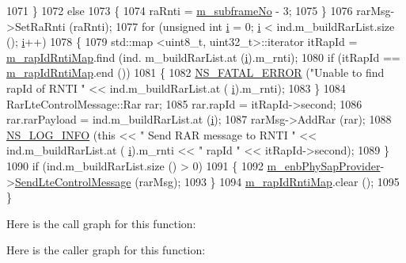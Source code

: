 \begin{DoxyCode}
1071     \}
1072   \textcolor{keywordflow}{else}
1073     \{
1074       raRnti = \hyperlink{classns3_1_1LteEnbMac_adccfd57ac8aedd1182963517546fde38}{m\_subframeNo} - 3;
1075     \}
1076   rarMsg->SetRaRnti (raRnti);
1077   \textcolor{keywordflow}{for} (\textcolor{keywordtype}{unsigned} \textcolor{keywordtype}{int} \hyperlink{bernuolliDistribution_8m_a6f6ccfcf58b31cb6412107d9d5281426}{i} = 0; \hyperlink{bernuolliDistribution_8m_a6f6ccfcf58b31cb6412107d9d5281426}{i} < ind.m\_buildRarList.size (); \hyperlink{bernuolliDistribution_8m_a6f6ccfcf58b31cb6412107d9d5281426}{i}++)
1078     \{
1079       std::map <uint8\_t, uint32\_t>::iterator itRapId = \hyperlink{classns3_1_1LteEnbMac_a8a3ccaeb5f77943019ed39250c3ea63e}{m\_rapIdRntiMap}.find (ind.
      m\_buildRarList.at (\hyperlink{bernuolliDistribution_8m_a6f6ccfcf58b31cb6412107d9d5281426}{i}).m\_rnti);
1080       \textcolor{keywordflow}{if} (itRapId == \hyperlink{classns3_1_1LteEnbMac_a8a3ccaeb5f77943019ed39250c3ea63e}{m\_rapIdRntiMap}.end ())
1081         \{
1082           \hyperlink{group__fatal_ga5131d5e3f75d7d4cbfd706ac456fdc85}{NS\_FATAL\_ERROR} (\textcolor{stringliteral}{"Unable to find rapId of RNTI "} << ind.m\_buildRarList.at (
      \hyperlink{bernuolliDistribution_8m_a6f6ccfcf58b31cb6412107d9d5281426}{i}).m\_rnti);
1083         \}
1084       RarLteControlMessage::Rar rar;
1085       rar.rapId = itRapId->second;
1086       rar.rarPayload = ind.m\_buildRarList.at (\hyperlink{bernuolliDistribution_8m_a6f6ccfcf58b31cb6412107d9d5281426}{i});
1087       rarMsg->AddRar (rar);
1088       \hyperlink{group__logging_gafbd73ee2cf9f26b319f49086d8e860fb}{NS\_LOG\_INFO} (\textcolor{keyword}{this} << \textcolor{stringliteral}{" Send RAR message to RNTI "} << ind.m\_buildRarList.at (
      \hyperlink{bernuolliDistribution_8m_a6f6ccfcf58b31cb6412107d9d5281426}{i}).m\_rnti << \textcolor{stringliteral}{" rapId "} << itRapId->second);
1089     \}
1090   \textcolor{keywordflow}{if} (ind.m\_buildRarList.size () > 0)
1091     \{
1092       \hyperlink{classns3_1_1LteEnbMac_a1f4686da5350f6b70b6b966322c109fd}{m\_enbPhySapProvider}->\hyperlink{classns3_1_1LteEnbPhySapProvider_a091d846bf3255f2ae15a8cea600fba0e}{SendLteControlMessage} (rarMsg);
1093     \}
1094   \hyperlink{classns3_1_1LteEnbMac_a8a3ccaeb5f77943019ed39250c3ea63e}{m\_rapIdRntiMap}.clear ();
1095 \}
\end{DoxyCode}


Here is the call graph for this function\+:




Here is the caller graph for this function\+:


